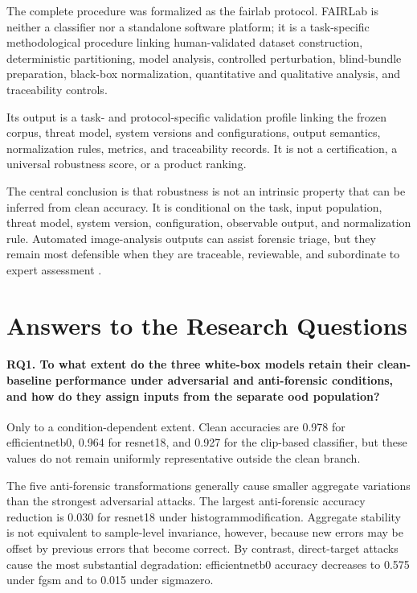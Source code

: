 The complete procedure was formalized as the \gls{fairlab} protocol. FAIRLab
is neither a classifier nor a standalone software platform; it is a
task-specific methodological procedure linking human-validated dataset
construction, deterministic partitioning, model analysis, controlled
perturbation, blind-bundle preparation, black-box normalization, quantitative
and qualitative analysis, and traceability controls.

Its output is a task- and protocol-specific validation profile linking the
frozen corpus, threat model, system versions and configurations, output
semantics, normalization rules, metrics, and traceability records. It is not a
certification, a universal robustness score, or a product ranking.

The central conclusion is that robustness is not an intrinsic property that
can be inferred from clean accuracy. It is conditional on the task, input
population, threat model, system version, configuration, observable output, and
normalization rule. Automated image-analysis outputs can assist forensic
triage, but they remain most defensible when they are traceable, reviewable,
and subordinate to expert assessment
\cite{costantini2019digital,sanna2024preliminary,sanna2025pixelperfect}.

\section{Answers to the Research Questions}
\label{sec:conclusions-research-questions}

\paragraph{\textbf{RQ1. To what extent do the three white-box models retain
their clean-baseline performance under adversarial and anti-forensic
conditions, and how do they assign inputs from the separate \gls{ood}
population?}}

Only to a condition-dependent extent. Clean accuracies are 0.978 for
\gls{efficientnetb0}, 0.964 for \gls{resnet18}, and 0.927 for the
\gls{clip}-based classifier, but these values do not remain uniformly representative
outside the clean branch.

The five anti-forensic transformations generally cause smaller aggregate
variations than the strongest adversarial attacks. The largest anti-forensic
accuracy reduction is 0.030 for \gls{resnet18} under
\gls{histogrammodification}. Aggregate stability is not equivalent to
sample-level invariance, however, because new errors may be offset by previous
errors that become correct. By contrast, direct-target attacks cause the most
substantial degradation: \gls{efficientnetb0} accuracy decreases to 0.575
under \gls{fgsm} and to 0.015 under \gls{sigmazero}.

